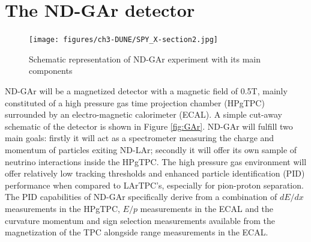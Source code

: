 \section{The ND-GAr detector}

\begin{figure}[t]
     \centering
     \texttt{[image: figures/ch3-DUNE/SPY\_X-section2.jpg]}
     \caption{Schematic representation of ND-GAr experiment with its main components}
        \label{fig:ND-G}
\end{figure}

ND-GAr will be a magnetized detector with a magnetic field of 0.5T, mainly constituted of a high pressure gas time projection chamber (HPgTPC) surrounded by an electro-magnetic calorimeter (ECAL). A simple cut-away schematic of the detector is shown in Figure \ref{fig:GAr}. ND-GAr will fulfill two main goals: firstly it will act as a spectrometer measuring the charge and momentum of particles exiting ND-LAr; secondly it will offer its own sample of neutrino interactions inside the HPgTPC. The high pressure gas environment will offer relatively low tracking thresholds and enhanced particle identification (PID) performance when compared to LArTPC's, especially for pion-proton separation. The PID capabilities of ND-GAr specifically derive from a combination of $dE/dx$ measurements in the HPgTPC, $E/p$ measurements in the ECAL and the curvature momentum and sign selection measurements available from the magnetization of the TPC alongside range measurements in the ECAL.


